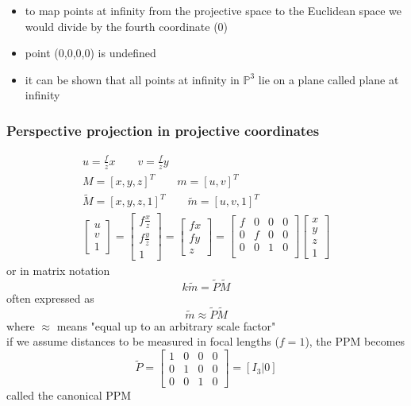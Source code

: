 \documentclass{article}
\begin{document}
\begin{itemize}
	\item to map points at infinity from the projective space to the Euclidean space we would divide by the fourth coordinate (0)
	\item point (0,0,0,0) is undefined
        \item it can be shown that all points at infinity in $\mathbb{P}^3$ lie on a plane called plane at infinity
\end{itemize}

\subsubsection{Perspective projection in projective coordinates}
\begin{gather}
	u=\frac{f}{z} x \qquad v=\frac{f}{z} y \\
	M= [x,y,z]^T \qquad m=[u,v]^T \\
	\tilde{M} = [x,y,z,1]^T \qquad \tilde{m} = [u,v,1]^T\\
	\begin{bmatrix}
	u\\
	v\\
	1
	\end{bmatrix} = \begin{bmatrix}
	f \frac{x}{z}\\
	f \frac{y}{z}\\
	1
	\end{bmatrix} = \begin{bmatrix}
	fx\\
	fy\\
	z
	\end{bmatrix} = \begin{bmatrix}
	f & 0 & 0 & 0\\
	0 & f & 0 & 0\\
	0 & 0 & 1 & 0\\
	\end{bmatrix} \begin{bmatrix}
	x\\
	y\\
	z\\
	1
	\end{bmatrix}
\end{gather}
or in matrix notation
\begin{equation}
	k \tilde{m} = \tilde{P} \tilde{M}
\end{equation}
often expressed as 
\begin{equation}
	\tilde{m} \approx \tilde{P} \tilde{M}
\end{equation}
where $\approx$ means "equal up to an arbitrary scale factor"\\
if we assume distances to be measured in focal lengths ($f=1$), the PPM becomes
\begin{equation}
    \tilde{P}= \begin{bmatrix}
        1 & 0 & 0 & 0 \\
        0 & 1 & 0 & 0 \\
        0 & 0 & 1 & 0 
    \end{bmatrix}=[I_3|0]
\end{equation}
called the canonical PPM
\end{document}
